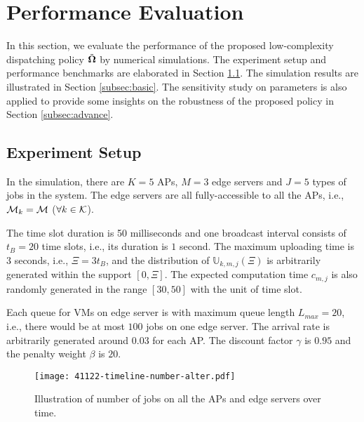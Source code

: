 \section{Performance Evaluation}
\label{sec:evaluation}
In this section, we evaluate the performance of the proposed low-complexity dispatching policy $\tilde{\boldsymbol{\Omega}}$ by numerical simulations.
The experiment setup and performance benchmarks are elaborated in Section \ref{subsec:setup}.
The simulation results are illustrated in Section \ref{subsec:basic}.
The sensitivity study on parameters is also applied to provide some insights on the robustness of the proposed policy in Section \ref{subsec:advance}.

\subsection{Experiment Setup}
\label{subsec:setup}
In the simulation, there are $K=5$ APs, $M=3$ edge servers and $J=5$ types of jobs in the system.
The edge servers are all fully-accessible to all the APs, i.e., $\mathcal{M}_{k}=\mathcal{M}$ ($\forall k\in\mathcal{K}$).

The time slot duration is 50 milliseconds and one broadcast interval consists of $t_{B}=20$ time slots, i.e., its duration is $1$ second.
The maximum uploading time is $3$ seconds, i.e., $\Xi = 3t_B$, and the distribution of $\mathbb{U}_{k,m,j}(\Xi)$ is arbitrarily generated within the support $[0, \Xi]$.
The expected computation time $c_{m,j}$ is also randomly generated in the range $[30,50]$ with the unit of time slot.

Each queue for VMs on edge server is with maximum queue length $L_{max}=20$, i.e., there would be at most $100$ jobs on one edge server.
The arrival rate is arbitrarily generated around $0.03$ for each AP.
The discount factor $\gamma$ is $0.95$ and the penalty weight $\beta$ is $20$.

\begin{figure}[ht!]                                                                             %
    \centering                                                                                  %
    \texttt{[image: 41122-timeline-number-alter.pdf]}                     %
    \caption{Illustration of number of jobs on all the APs and edge servers over time.}
    \label{fig:general_timeline}                                                                %
\end{figure}                                                                                    %


